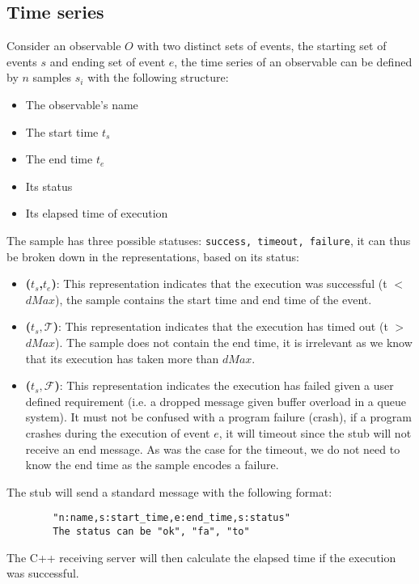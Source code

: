 \subsection{Time series}
    Consider an observable $O$ with two distinct sets of events, the starting set of events $s$ and ending set of event $e$, the time series of an observable can be defined by $n$ samples $s_i$ with the following structure:
    \begin{itemize}
        \item The observable's name
        \item The start time $t_s$
        \item The end time $t_e$
        \item Its status 
        \item Its elapsed time of execution
    \end{itemize}
    The sample has three possible statuses: \texttt{success, timeout, failure}, it can thus be broken down in the representations, based on its status:
    \begin{itemize}
        \item \textbf{($t_s$,$t_e$)}: This representation indicates that the execution was successful (t $<$ $dMax$), the sample contains the start time and end time of the event.
        \item \textbf{($t_s, \mathcal{T}$)}: This representation indicates that the execution has timed out (t $>$ $dMax$). The sample does not contain the end time, it is irrelevant as we know that its execution has taken more than $dMax$.
            \item \textbf{($t_s, \mathcal{F}$)}: This representation indicates the execution has failed given a user defined requirement (i.e. a dropped message given buffer overload in a queue system). It must not be confused with a program failure (crash), if a program crashes during the execution of event $e$, it will timeout since the stub will not receive an end message. As was the case for the timeout, we do not need to know the end time as the sample encodes a failure.
    \end{itemize}

    The stub will send a standard message with the following format:
    \begin{verbatim}
        "n:name,s:start_time,e:end_time,s:status"
        The status can be "ok", "fa", "to"
    \end{verbatim}
    The C++ receiving server will then calculate the elapsed time if the execution was successful.


